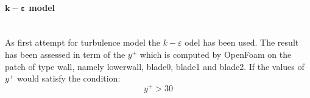 \documentclass[a4paper,12pt]{article}
\newcommand{\foam}[1]{{\ttfamily #1}}
\newcommand{\kepsilon}[1]{$k\!-\!\varepsilon $ }
\begin{document}
\begin{figure}[H]
\centering
{}
\end{figure}


\paragraph{$\bm{k}-\bm{\varepsilon}$ model}  \mbox{}\\
As first attempt for turbulence model the \kepsilon model has been used.
The result has been assessed in term of the $y^+ $ which is computed by OpenFoam on the patch of type \foam{wall}, namely \foam{lowerwall}, \foam{blade0}, \foam{blade1} and \foam{blade2}.
If the values of $y^+ $ would satisfy the condition:
\begin{equation}
y^+ > 30
\end{equation}
\end{document}

